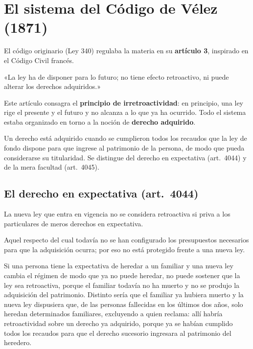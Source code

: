 \documentclass[12pt,oneside]{book}
\begin{document}
\section{El sistema del Código de Vélez (1871)}

El código originario (Ley 340) regulaba la materia en su \textbf{artículo 3}, inspirado en el Código Civil francés.

\begin{regla}
«La ley ha de disponer para lo futuro; no tiene efecto retroactivo, ni puede alterar los derechos adquiridos.»
\end{regla}

Este artículo consagra el \textbf{principio de irretroactividad}: en principio, una ley rige el presente y el futuro y no alcanza a lo que ya ha ocurrido. Todo el sistema estaba organizado en torno a la noción de \textbf{derecho adquirido}.

\begin{definicion}
Un derecho está adquirido cuando se cumplieron todos los recaudos que la ley de fondo dispone para que ingrese al patrimonio de la persona, de modo que pueda considerarse su titularidad. Se distingue del derecho en expectativa (art.~4044) y de la mera facultad (art.~4045).
\end{definicion}

\subsection{El derecho en expectativa (art.~4044)}

\begin{regla}
La nueva ley que entra en vigencia no se considera retroactiva si priva a los particulares de meros derechos en expectativa.
\end{regla}

\begin{definicion}
Aquel respecto del cual todavía no se han configurado los presupuestos necesarios para que la adquisición ocurra; por eso no está protegido frente a una nueva ley.
\end{definicion}

\begin{ejemplo}
Si una persona tiene la expectativa de heredar a un familiar y una nueva ley cambia el régimen de modo que ya no puede heredar, no puede sostener que la ley sea retroactiva, porque el familiar todavía no ha muerto y no se produjo la adquisición del patrimonio. Distinto sería que el familiar ya hubiera muerto y la nueva ley dispusiera que, de las personas fallecidas en los últimos dos años, solo heredan determinados familiares, excluyendo a quien reclama: allí habría retroactividad sobre un derecho ya adquirido, porque ya se habían cumplido todos los recaudos para que el derecho sucesorio ingresara al patrimonio del heredero.
\end{ejemplo}
\end{document}
